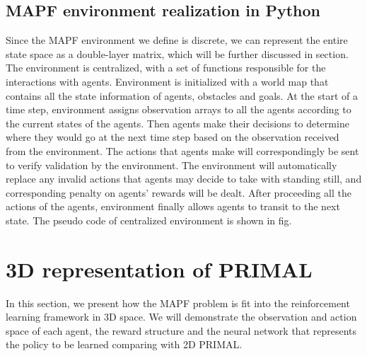 \documentclass[sigconf,authordraft, nonacm=true]{acmart}
\begin{document}
\subsection{MAPF environment realization in Python}
Since the MAPF environment we define is discrete, we can represent the entire state space as a double-layer matrix, which will be further discussed in section.  The environment is centralized, with a set of functions responsible for the interactions with agents. Environment is initialized with a world map that contains all the state information of agents, obstacles and goals. At the start of a time step, environment assigns observation arrays to all the agents according to the current states of the agents. Then agents make their decisions to determine where they would go at the next time step based on the observation received from the environment. The actions that agents make will correspondingly be sent to verify validation by the environment. The environment will automatically replace any invalid actions that agents may decide to take with standing still, and corresponding penalty on agents’ rewards will be dealt. After proceeding all the actions of the agents, environment finally allows agents to transit to the next state. The pseudo code of centralized environment is shown in fig.

\section{3D representation of PRIMAL}

In this section, we present how the MAPF problem is fit into the reinforcement learning framework in 3D space. We will demonstrate the observation and action space of each agent, the reward structure and the neural network that represents the policy to be learned comparing with 2D PRIMAL.
\end{document}
